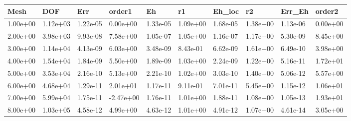 \begin{tabular}{llllllllll}
Mesh & DOF & Err & order1 & Eh & r1 & Eh_loc & r2 & Err_Eh & order2 \\ 
\hline 
1.00e+00 & 1.12e+03 & 1.22e-05 &  0.00e+00 & 1.33e-05 & 1.09e+00 & 1.68e-05 & 1.38e+00 & 1.13e-06 & 0.00e+00 \\ 
2.00e+00 & 3.98e+03 & 9.93e-08 &  7.58e+00 & 1.05e-07 & 1.05e+00 & 1.16e-07 & 1.17e+00 & 5.30e-09 & 8.45e+00 \\ 
3.00e+00 & 1.14e+04 & 4.13e-09 &  6.03e+00 & 3.48e-09 & 8.43e-01 & 6.62e-09 & 1.61e+00 & 6.49e-10 & 3.98e+00 \\ 
4.00e+00 & 1.54e+04 & 1.84e-09 &  5.50e+00 & 1.89e-09 & 1.03e+00 & 2.24e-09 & 1.22e+00 & 5.16e-11 & 1.72e+01 \\ 
5.00e+00 & 3.53e+04 & 2.16e-10 &  5.13e+00 & 2.21e-10 & 1.02e+00 & 3.03e-10 & 1.40e+00 & 5.06e-12 & 5.57e+00 \\ 
6.00e+00 & 4.68e+04 & 1.29e-11 &  2.01e+01 & 1.17e-11 & 9.11e-01 & 7.01e-11 & 5.45e+00 & 1.15e-12 & 1.06e+01 \\ 
7.00e+00 & 5.99e+04 & 1.75e-11 & -2.47e+00 & 1.76e-11 & 1.01e+00 & 1.88e-11 & 1.08e+00 & 1.05e-13 & 1.93e+01 \\ 
8.00e+00 & 1.03e+05 & 4.58e-12 &  4.99e+00 & 4.63e-12 & 1.01e+00 & 4.91e-12 & 1.07e+00 & 4.61e-14 & 3.05e+00 \\ 
\hline 
\end{tabular}